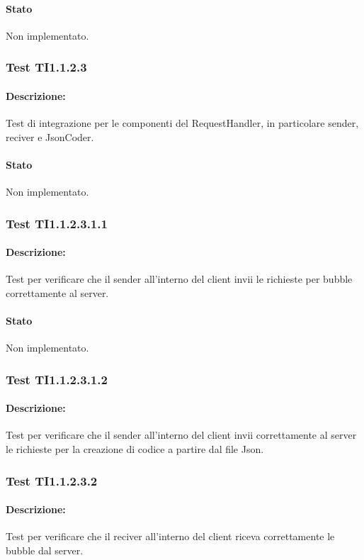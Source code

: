 \documentclass[../PianoDiQualifica.tex]{subfiles}
\begin{document}
	\paragraph{Stato} Non implementato.
	\subsubsection{Test TI1.1.2.3}
	\paragraph{Descrizione:} Test di integrazione per le componenti del RequestHandler, in particolare sender, reciver e JsonCoder.
	\paragraph{Stato} Non implementato.
	\subsubsection{Test TI1.1.2.3.1.1}
	\paragraph{Descrizione:} Test per verificare che il sender all'interno del client invii le richieste per bubble correttamente al server.
	\paragraph{Stato} Non implementato.
	
	\subsubsection{Test TI1.1.2.3.1.2}
	\paragraph{Descrizione:} Test per verificare che il sender all'interno del client invii  correttamente al server le richieste per la creazione di codice a partire dal file Json.
	\subsubsection{Test TI1.1.2.3.2}
	\paragraph{Descrizione:} Test per verificare che il reciver all'interno del client riceva correttamente le bubble dal server.
\end{document}

